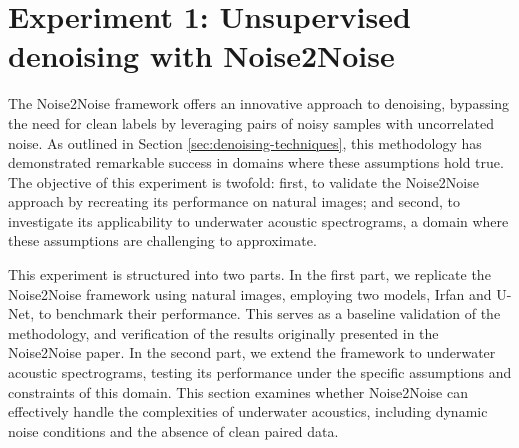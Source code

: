 




\section{Experiment 1: Unsupervised denoising with Noise2Noise}

The Noise2Noise framework offers an innovative approach to denoising, bypassing the need for clean labels by leveraging pairs of noisy samples with uncorrelated noise. As outlined in Section \ref{sec:denoising-techniques}, this methodology has demonstrated remarkable success in domains where these assumptions hold true. The objective of this experiment is twofold: first, to validate the Noise2Noise approach by recreating its performance on natural images; and second, to investigate its applicability to underwater acoustic spectrograms, a domain where these assumptions are challenging to approximate.

This experiment is structured into two parts. In the first part, we replicate the Noise2Noise framework using natural images, employing two models, Irfan and U-Net, to benchmark their performance. This serves as a baseline validation of the methodology, and verification of the results originally presented in the Noise2Noise paper. In the second part, we extend the framework to underwater acoustic spectrograms, testing its performance under the specific assumptions and constraints of this domain. This section examines whether Noise2Noise can effectively handle the complexities of underwater acoustics, including dynamic noise conditions and the absence of clean paired data.

